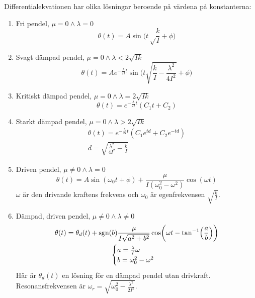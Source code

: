 \documentclass[12pt, a4paper]{article}
\DeclareMathOperator{\sgn}{sgn}
\begin{document}
Differentialekvationen har olika lösningar beroende på värdena på konstanterna:
\begin{enumerate}
    \item Fri pendel, $\mu=0\land\lambda=0$
    \begin{equation}\label{eq:fri_pendel}
        \theta(t)=A\sin\biggl(t\sqrt\frac{k}{I}+\phi\biggr)
    \end{equation}
    \item Svagt dämpad pendel, $\mu=0\land\lambda<2\sqrt{Ik}$
    \begin{equation}\label{eq:svagt_dämpad}
        \theta(t)=Ae^{-\frac{\lambda}{2I}t}\sin\biggl(t\sqrt{\frac{k}{I}-\frac{\lambda^2}{4I^2}}+\phi\biggr)
    \end{equation}
    \item Kritiskt dämpad pendel, $\mu=0\land\lambda=2\sqrt{Ik}$
    \begin{equation}
        \theta(t)=e^{-\frac{\lambda}{2I}t}\left(C_1t+C_2\right)
    \end{equation}
    \item Starkt dämpad pendel, $\mu=0\land\lambda>2\sqrt{Ik}$
    \begin{equation}\label{eq:starkt_dämpad}
        \begin{gathered}
            \theta(t)=e^{-\frac{\lambda}{2I}t}\left(C_1e^{td}+C_2e^{-td}\right)\\
            d=\sqrt{\frac{\lambda^2}{4I^2}-\frac{k}{I}}
        \end{gathered}
    \end{equation}
    \item Driven pendel, $\mu\neq0\land\lambda=0$
    \begin{equation}
        \theta(t)=A\sin(\omega_0t+\phi)+\frac{\mu}{I(\omega_0^2-\omega^2)}\cos(\omega t)
    \end{equation}
    $\omega$ är den drivande kraftens frekvens och $\omega_0$ är egenfrekvensen $\sqrt{\frac{k}{I}}$.
    \item Dämpad, driven pendel, $\mu\neq0\land\lambda\neq0$
    \begin{equation}
        \begin{gathered}
            \theta(t)=\theta_d(t)+\sgn(b)\frac{\mu}{I\sqrt{a^2+b^2}}\cos\biggl(\omega t-\tan^{-1}\Bigl(\frac{a}{b}\Bigr)\biggr)\\
            \begin{cases}
                a=\frac{\lambda}{I}\omega\\
                b=\omega_0^2-\omega^2
            \end{cases}
        \end{gathered}        
    \end{equation}
    Här är $\theta_d(t)$ en lösning för en dämpad pendel utan drivkraft. Resonansfrekvensen är $\omega_r=\sqrt{\omega_0^2-\frac{\lambda^2}{2I^2}}$.
\end{enumerate}
\end{document}
